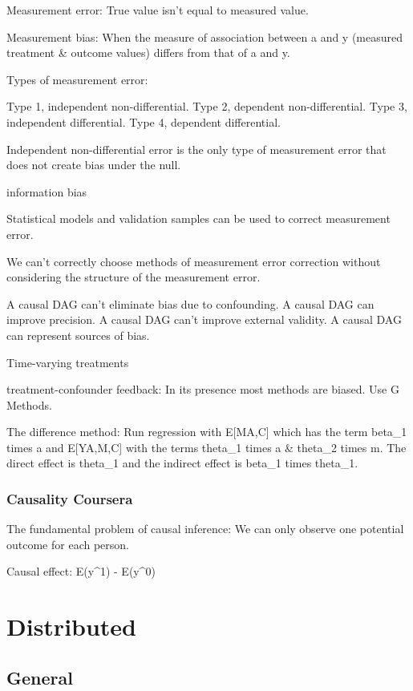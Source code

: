\documentclass[]{book}
\begin{document}
Measurement error: True value isn't equal to measured value.

Measurement bias: When the measure of association between a and y (measured treatment \& outcome values) differs from that of a and y.

Types of measurement error:

Type 1, independent non-differential.
Type 2, dependent non-differential.
Type 3, independent differential.
Type 4, dependent differential.

Independent non-differential error is the only type of measurement error that does not create bias under the null.

information bias

Statistical models and validation samples can be used to correct measurement error.

We can't correctly choose methods of measurement error correction without considering the structure of the measurement error.

A causal DAG can't eliminate bias due to confounding. A causal DAG can improve precision. A causal DAG can't improve external validity. A causal DAG can represent sources of bias.

Time-varying treatments

treatment-confounder feedback: In its presence most methods are biased. Use G Methods.

The difference method: Run regression with E{[}M\textbar{}A,C{]} which has the term beta\_1 times a and E{[}Y\textbar{}A,M,C{]} with the terms theta\_1 times a \& theta\_2 times m. The direct effect is theta\_1 and the indirect effect is beta\_1 times theta\_1.

\hypertarget{causality-coursera}{%
\subsection{Causality Coursera}\label{causality-coursera}}

The fundamental problem of causal inference: We can only observe one potential outcome for each person.

Causal effect: E(y\^{}1) - E(y\^{}0)

\hypertarget{distributed}{%
\chapter{Distributed}\label{distributed}}

\hypertarget{general-10}{%
\section{General}\label{general-10}}
\end{document}
